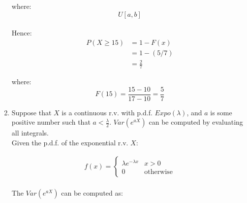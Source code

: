 \documentclass{article}
\begin{document}
\begin{enumerate}
    where:
    \begin{equation}
        U[a,b]
    \end{equation}\\

    Hence:
    \begin{equation}
        \begin{split}
            P(X \geq 15) &= 1 - F(x)\\
            &= 1 - (5/7)\\
            &= \frac{2}{7}
        \end{split}
    \end{equation}
    
    where:
    \begin{equation}
        F(15) = \frac{15-10}{17-10} = \frac{5}{7}
    \end{equation}

    \item Suppose that $X$ is a continuous r.v. with p.d.f. $Expo(\lambda)$, and $a$ is some positive number such that $a < \frac{\lambda}{2}$. $Var(e^{aX})$ can be computed by evaluating all integrals.\\

    Given the p.d.f. of the exponential r.v. $X$:
    
    \begin{equation}
        \begin{split}
            f(x) = \begin{cases}
            \lambda e^{-\lambda x} & x > 0\\
            0 & \text{otherwise}
            \end{cases}
        \end{split}
    \end{equation}\\

    The $Var(e^{aX})$ can be computed as:
    

\end{enumerate}
\end{document}
